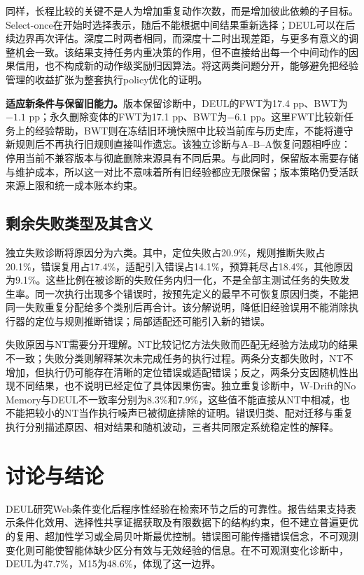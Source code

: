 \documentclass[sigconf,anonymous,review]{acmart}
\theoremstyle{zhplain}
\begin{document}
同样，长程比较的关键不是人为增加重复动作次数，而是增加彼此依赖的子目标。Select-once在开始时选择表示，随后不能根据中间结果重新选择；DEUL可以在后续边界再次评估。深度二时两者相同，而深度十二时出现差距，与更多有意义的调整机会一致。该结果支持任务内重决策的作用，但不直接给出每一个中间动作的因果信用，也不构成新的动作级奖励归因算法。将这两类问题分开，能够避免把经验管理的收益扩张为整套执行policy优化的证明。

\textbf{适应新条件与保留旧能力。}版本保留诊断中，DEUL的FWT为17.4 pp、BWT为\(-1.1\) pp；永久删除变体的FWT为17.1 pp、BWT为\(-6.1\) pp。这里FWT比较新任务上的经验帮助，BWT则在冻结旧环境快照中比较当前库与历史库，不能将遵守新规则后不再执行旧规则直接叫作遗忘。该独立诊断与A--B--A恢复问题相呼应：停用当前不兼容版本与彻底删除来源具有不同后果。与此同时，保留版本需要存储与维护成本，所以这一对比不意味着所有旧经验都应无限保留；版本策略仍受活跃来源上限和统一成本账本约束。

\subsection{剩余失败类型及其含义}
独立失败诊断将原因分为六类。其中，定位失败占20.9\%，规则推断失败占20.1\%，错误复用占17.4\%，适配引入错误占14.1\%，预算耗尽占18.4\%，其他原因为9.1\%。这些比例在被诊断的失败任务内归一化，不是全部主测试任务的失败发生率。同一次执行出现多个错误时，按预先定义的最早不可恢复原因归类，不能把同一失败重复分配给多个类别后再合计。该分解说明，降低旧经验误用不能消除执行器的定位与规则推断错误；局部适配还可能引入新的错误。

失败原因与NT需要分开理解。NT比较记忆方法失败而匹配无经验方法成功的结果不一致；失败分类则解释某次未完成任务的执行过程。两条分支都失败时，NT不增加，但执行仍可能存在清晰的定位错误或适配错误；反之，两条分支因随机性出现不同结果，也不说明已经定位了具体因果伤害。独立重复诊断中，W-Drift的No Memory与DEUL不一致率分别为8.3\%和7.9\%，这些值不能直接从NT中相减，也不能把较小的NT当作执行噪声已被彻底排除的证明。错误归类、配对迁移与重复执行分别描述原因、相对结果和随机波动，三者共同限定系统稳定性的解释。


\section{讨论与结论}
DEUL研究Web条件变化后程序性经验在检索环节之后的可靠性。报告结果支持表示条件化效用、选择性共享证据获取及有限数据下的结构约束，但不建立普遍更优的复用、超加性学习或全局贝叶斯最优控制。错误图可能传播错误信念，不可观测变化则可能使智能体缺少区分有效与无效经验的信息。在不可观测变化诊断中，DEUL为47.7\%，M15为48.6\%，体现了这一边界。
\end{document}
